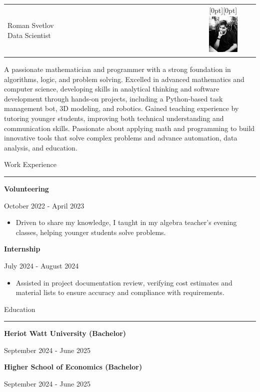 \documentclass{letter}
\begin{document}
\begin{minipage}[t]{0.60\textwidth}
\setlength{\baselineskip}{1.5\baselineskip}
\vspace{0.8cm}

\begin{tabular}{@{} p{0.8\linewidth} p{0.3\linewidth} @{}}
    \parbox[t]{0.8\linewidth}{
        {\huge Roman Svetlov}\\
        {\large Data Scientist}
    } &
    \raisebox{-0.5\height}[0pt][0pt]{
        \includegraphics[width=1.5cm,height=2cm,keepaspectratio]{resume_photo.JPG}
    }
\end{tabular}

\vspace{0.8cm}

A passionate mathematician and programmer with a strong foundation in algorithms, logic, and problem solving. Excelled in advanced mathematics and computer science, developing skills in analytical thinking and software development through hands-on projects, including a Python-based task management bot, 3D modeling, and robotics. Gained teaching experience by tutoring younger students, improving both technical understanding and communication skills. Passionate about applying math and programming to build innovative tools that solve complex problems and advance automation, data analysis, and education.

\vspace{0.5cm}

{\large Work Experience}
\rule{\linewidth}{0.4pt}

{\large \textbf{Volunteering}}

{\small October 2022 - April 2023}

\begin{itemize}
    \item Driven to share my knowledge, I taught in my algebra teacher's evening classes, helping younger students solve problems.
\end{itemize}

{\large \textbf{Internship}}

{\small July 2024 - August 2024}

\begin{itemize}
    \item Assisted in project documentation review, verifying cost estimates and material lists to ensure accuracy and compliance with requirements.
\end{itemize}

{\large Education}
\rule{\linewidth}{0.4pt}

{\large \textbf{Heriot Watt University (Bachelor)}}

{\small September 2024 - June 2025}

{\large \textbf{Higher School of Economics (Bachelor)}}

{\small September 2024 - June 2025}

\end{minipage}
\end{document}
